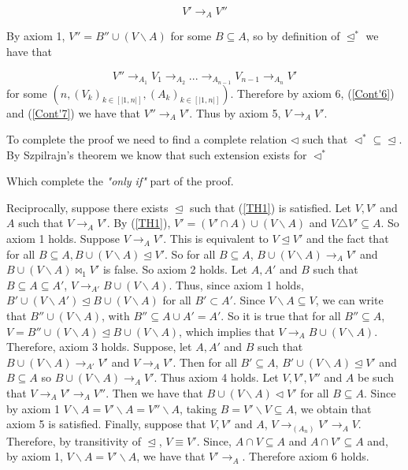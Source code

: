 \documentclass[11pt]{article}
\begin{document}
\begin{equation}
V'\rightarrow_A V''
\label{Cont'7}
\end{equation}

By axiom 1, $V''= B''\cup (V\backslash A)$ for some $B\subseteq A$, so by definition of $\trianglelefteq^*$ we have that 

\begin{equation}
 V''\rightarrow_{A_1} V_1 \rightarrow_{A_2}...\rightarrow_{A_{n-1}} V_{n-1}\rightarrow_{A_n}V'
\label{Cont'6}
\end{equation}
for some $(n,(V_k)_{k\in [|1,n|]}, (A_k)_{k\in[|1,n|]})$. Therefore by axiom 6, (\ref{Cont'6}) and (\ref{Cont'7}) we have that $V''\rightarrow_A V'$. Thus by axiom 5, $V\rightarrow_A V'$. 

To complete the proof we need to find a complete relation $\triangleleft$ such that $\triangleleft^* \subseteq \trianglelefteq$. By Szpilrajn's theorem we know that such extension exists for $\triangleleft^*$

Which complete the \textit{"only if"} part of the proof. 


 Reciprocally, suppose there exists $\trianglelefteq$ such that (\ref{TH1}) is satisfied. Let $V,V'$ and $A$ such that $V\rightarrow_A V'$. By (\ref{TH1}), $V'=(V'\cap A)\cup (V\backslash A)$ and $V\triangle V' \subseteq A$. So axiom 1 holds. Suppose $V\rightarrow_A V'$. This is equivalent to $V\trianglelefteq V'$ and the fact that for all $B\subseteq A, B\cup (V\backslash A )\trianglelefteq V'$. So for all $B\subseteq A$, $B\cup (V\backslash A )\rightarrow_A V'$ and $B\cup (V\backslash A )\bowtie_1 V'$ is false. So axiom 2 holds. Let $A,A'$ and $B$ such that $B\subseteq A \subseteq A'$,  $V\rightarrow_{A'} B\cup (V\backslash A)$. Thus, since axiom 1 holds, $ B'\cup (V\backslash A')\trianglelefteq B\cup (V\backslash A)$ for all $B'\subset A'$. Since $V\backslash A\subseteq V$, we can write that $ B''\cup (V\backslash A)$, with $B''\subseteq A\cup A' = A'$. So it is true that for all $B''\subseteq A$, $ V=B''\cup (V\backslash A)\trianglelefteq B\cup (V\backslash A)$, which implies that $V\rightarrow_A B\cup (V\backslash A)$. Therefore, axiom 3 holds. Suppose, let $A,A'$ and $B$ such that $B\cup (V\backslash A )\rightarrow_{A'} V'$ and $V\rightarrow_A V'$. Then for all $B'\subseteq A$, $B'\cup (V\backslash A) \trianglelefteq V'$ and $B\subseteq A$ so $B\cup (V\backslash A )\rightarrow_{A} V'$. Thus axiom 4 holds. Let $V,V', V''$ and $A$ be such that $V\rightarrow_A V'\rightarrow_A V''$. Then we have that $B\cup (V\backslash A)\triangleleft  V'$ for all $B\subseteq A$. Since by axiom 1 $V\backslash A = V'\backslash A = V''\backslash A$, taking $B= V'\backslash V \subseteq A$, we obtain that axiom 5 is satisfied. Finally, suppose that  $V,V'$ and $A$, $V\rightarrow_{(A_n)} V'\rightarrow_{A} V$. Therefore, by transitivity of $\trianglelefteq$, $V\equiv V'$. Since, $A\cap V \subseteq A$ and $A\cap V'\subseteq A$ and, by axiom 1, $V\backslash A=V'\backslash A$, we have that $V'\rightarrow_A$. Therefore axiom 6 holds.
 
\end{document}
